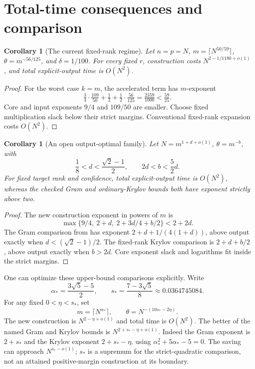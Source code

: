 \documentclass[11pt]{article}
\newtheorem{corollary}[theorem]{Corollary}
\begin{document}
\section{Total-time consequences and comparison}
\begin{corollary}[The current fixed-rank regime]\label{cor:example}
Let \(n=p=N\), \(m=\lceil N^{50/59}\rceil\),
\(\theta=m^{-56/125}\), and \(\delta=1/100\).
For every fixed \(r\), construction costs
\(N^{2-1/1180+o(1)}\), and total explicit-output time is \(O(N^2)\).
\end{corollary}
\begin{proof}
For the worst case \(k=m\), the accelerated term has \(m\)-exponent
\[
 \tfrac34\cdot\tfrac{109}{50}+\tfrac12+
                    \tfrac12\cdot\tfrac{56}{125}
 =\tfrac{2359}{1000}<\tfrac{59}{25}.
\]
Core and input exponents \(9/4\) and \(109/50\) are smaller.
Choose fixed multiplication slack below their strict margins.
Conventional fixed-rank expansion costs \(O(N^2)\).
\end{proof}

\begin{corollary}[An open output-optimal family]\label{cor:family}
Let \(N=m^{1+d+o(1)}\), \(\theta=m^{-b}\), with
\[
 \frac18<d<\frac{\sqrt2-1}{2},\qquad 2d<b<\frac52d .
\]
For fixed target rank and confidence, total explicit-output time is
\(O(N^2)\), whereas the checked Gram and ordinary-Krylov bounds both
have exponent strictly above two.
\end{corollary}
\begin{proof}
The new construction exponent in powers of \(m\) is
\[
 \max\{9/4,\ 2+d,\ 2+3d/4+b/2\}<2+2d.
\]
The Gram comparison from \cite{amanov} has exponent
\(2+d+1/(4(1+d))\), above output exactly when
\(d<(\sqrt2-1)/2\).
The fixed-rank Krylov comparison is \(2+d+b/2\), above output
exactly when \(b>2d\). Core exponent slack and logarithms fit
inside the strict margins.
\end{proof}

One can optimize these upper-bound comparisons explicitly. Write
\[
 \alpha_*=\frac{3\sqrt5-5}{2},\qquad
 s_*=\frac{7-3\sqrt5}{8}\approx0.0364745084 .
\]
For any fixed \(0<\eta<s_*\), set
\[
 m=\lceil N^{\alpha_*}\rceil,\qquad
 \theta=N^{-(10s_*-2\eta)}.
\]
The new construction is \(N^{2-\eta+o(1)}\) and total time is
\(O(N^2)\). The better of the named Gram and Krylov bounds is
\(N^{2+s_*-\eta+o(1)}\).
Indeed the Gram exponent is \(2+s_*\) and the Krylov exponent
\(2+s_*-\eta\), using \(\alpha_*^2+5\alpha_*-5=0\).
The saving can approach \(N^{s_*-o(1)}\); \(s_*\) is a supremum
for the strict-quadratic comparison, not an attained positive-margin
construction at its boundary.
\end{document}
